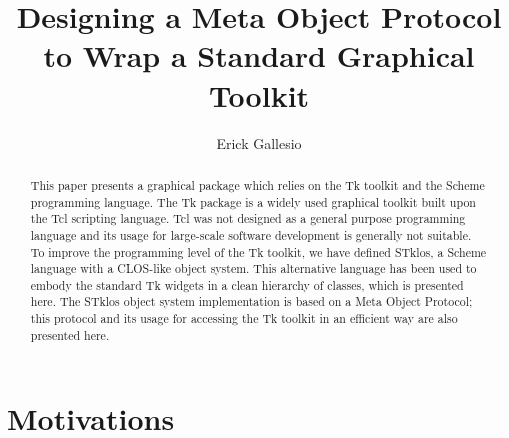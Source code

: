 %
%
%


\newcommand{\figsize}{\small}
\newcommand{\stk}{\mbox{\sc STk}}
\newcommand{\stklos}{\mbox{\sc STklos}}
\newcommand{\Indextt}[1]{{\tt{#1}}\index{#1}}
\newcommand{\Index}[1]{{#1}\index{#1}}
\newcommand{\rrrr}{{\em R$^{4}\!RS$}}
\newcommand{\codesize}{\small}
\newenvironment{Code}{\begin{quote}\begin{minipage}{12cm}\codesize}{\end{minipage}\end{quote}}


\title{Designing a Meta Object Protocol to Wrap a Standard Graphical Toolkit}

\author{Erick Gallesio}

\maketitle


\begin{abstract}
This paper presents a graphical package which relies on the Tk toolkit and
the Scheme programming language. The Tk package is a widely used graphical
toolkit built upon the Tcl scripting language. Tcl was not designed as a
general purpose programming language and its usage for large-scale software
development is generally not suitable. To improve the programming level of
the Tk toolkit, we have defined {\stklos}, a Scheme language with a
CLOS-like object system. This alternative language has been used to embody
the standard Tk widgets in a clean hierarchy of classes, which is presented
here. The {\stklos} object system implementation is based on a Meta Object
Protocol; this protocol and its usage for accessing the Tk toolkit in an
efficient way are also presented here.
\end{abstract}


\section{Motivations}

